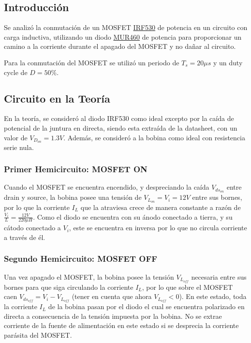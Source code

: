 



\subsection{Introducción}

Se analizó la conmutación de un MOSFET \href{https://www.vishay.com/docs/91019/91019.pdf}{IRF530} de potencia en un circuito con carga inductiva, utilizando un diodo \href{https://www.onsemi.com/pdf/datasheet/mur420-d.pdf}{MUR460} de potencia para proporcionar un camino a la corriente durante el apagado del MOSFET y no dañar al circuito.


Para la conmutación del MOSFET se utilizó un periodo de $T_s = 20 \mu s$ y un duty cycle de $D = 50 \%$.

\subsection{Circuito en la Teoría}

En la teoría, se consideró al diodo IRF530 como ideal excepto por la caída de potencial de la juntura en directa, siendo esta extraída de la datasheet, con un valor de $V_{D_{on}} = 1.3V$. Además, se consideró a la bobina como ideal con resistencia serie nula.

\subsubsection{Primer Hemicircuito: MOSFET ON}

Cuando el MOSFET se encuentra encendido, y despreciando la caída $V_{ds_{on}}$ entre drain y source, la bobina posee una tensión de $V_{L_{on}} = V_i = 12V$ entre sus bornes, por lo que la corriente $I_L$ que la atraviesa crece de manera constante a razón de $\frac{V_i}{L} = \frac{12V}{220\mu H}$. Como el diodo se encuentra con su ánodo conectado a tierra, y su cátodo conectado a $V_i$, este se encuentra en inversa por lo que no circula corriente a través de él.

\subsubsection{Segundo Hemicircuito: MOSFET OFF}

Una vez apagado el MOSFET, la bobina posee la tensión $V_{L_{off}}$ necesaria entre sus bornes para que siga circulando la corriente $I_L$, por lo que sobre el MOSFET caen $V_{ds_{off}} = V_i - V_{L_{off}}$ (tener en cuenta que ahora $V_{L_{off}} < 0$). En este estado, toda la corriente $I_L$ de la bobina pasan por el diodo el cual se encuentra polarizado en directa a consecuencia de la tensión impuesta por la bobina. No se extrae corriente de la fuente de alimentación en este estado si se desprecia la corriente parásita del MOSFET.

